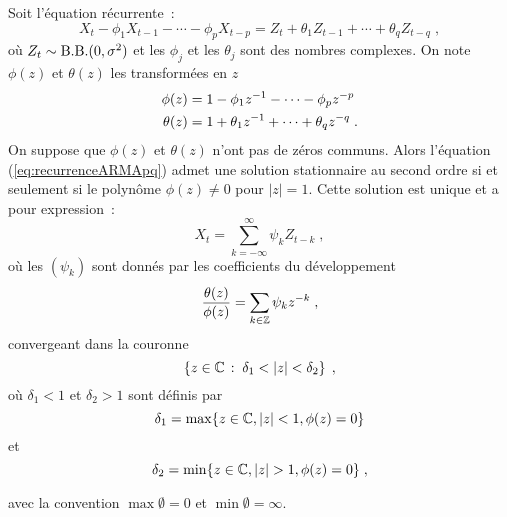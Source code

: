 \begin{theorem}
\label{theo:ARMApq} Soit l'\'equation r\'ecurrente~:
\begin{equation}
 \label{eq:recurrenceARMApq}
  X_t - \phi_1 X_{t-1} - \cdots - \phi_p X_{t-p}
  =
  Z_t + \theta_1 Z_{t-1} + \cdots + \theta_q Z_{t-q}\;,
\end{equation} o\`u $Z_t \sim \mathrm{B.B.}(0,\sigma^2)$ et les
$\phi_j$ et les $\theta_j$ sont des nombres complexes. On note $\phi(z)$ et $\theta(z)$ les transformées en $z$
\begin{align}
\label{eq:tz-phi}
\phi(z)&= 1 - \phi_1 z^{-1} - \dots - \phi_p z^{-p} \\
\label{eq:tz-theta}
\theta(z)&= 1 + \theta_1 z^{-1} + \dots + \theta_q z^{-q}  \;.
\end{align}
On suppose que $\phi(z)$ et $\theta(z)$ n'ont pas de z\'eros communs. Alors l'\'equation
(\ref{eq:recurrenceARMApq}) admet une solution stationnaire au
second ordre si et seulement si le polyn\^ome $\phi(z) \neq 0$ pour
$|z| = 1$. Cette solution est unique et a pour expression~:
\begin{equation}
 \label{eq:solutionARMApq}
 X_t = \sum_{k=-\infty}^{\infty} \psi_k Z_{t-k}\;,
\end{equation}
o\`u les $(\psi_k)$ sont donn\'es par les coefficients du d\'eveloppement
\begin{equation}\label{eq:dev_laurent_statio}
\frac{\theta(z)}{\phi(z)}=\sum_{k\in\mathbb{Z}}\psi_k z^{-k}\;,
\end{equation}
convergeant dans la couronne
\begin{equation}
\label{eq:RC-psi}
\ensemble{ z\in\cset}{\delta_1<|z|<\delta_2} \eqsp,
\end{equation}
o\`u $\delta_1<1$ et $\delta_2>1$ sont d\'efinis par
\begin{equation}
\label{eq:definition-delta1}
\delta_1=\max\{ z \in \mathbb{C}, | z | < 1, \phi(z) =0 \}
\end{equation}
et
\begin{equation}
\label{eq:definition-delta2}
\delta_2=\min \{ z \in \mathbb{C}, |z| > 1, \phi(z) = 0 \} \;,
\end{equation}
\end{theorem}
avec la convention $\max \emptyset = 0$ et $\min \emptyset = \infty$.
